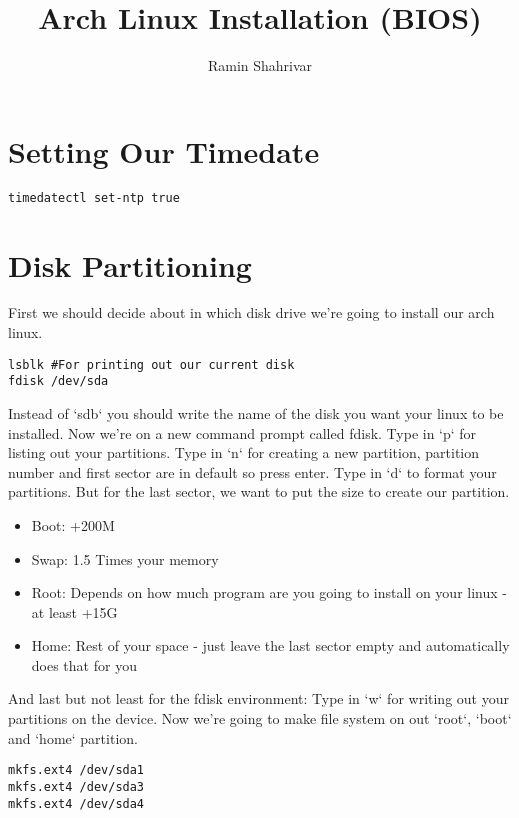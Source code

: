\documentclass[12pt]{article}
\title{Arch Linux Installation (BIOS)}
\author{Ramin Shahrivar}
\begin{document}
\maketitle
\tableofcontents
\pagebreak
\thispagestyle{empty}


\section{Setting Our Timedate}
\begin{verbatim}
timedatectl set-ntp true
\end{verbatim}

\section{Disk Partitioning}
First we should decide about in which disk drive we're going to install our arch linux.
\begin{verbatim}
lsblk #For printing out our current disk
fdisk /dev/sda
\end{verbatim}
Instead of `sdb` you should write the name of the disk you want your linux to be installed.
Now we're on a new command prompt called fdisk.
Type in `p` for listing out your partitions.
Type in `n` for creating a new partition, partition number and first sector are in default so press enter.
Type in `d` to format your partitions.
But for the last sector, we want to put the size to create our partition.

\begin{framed}
\begin{itemize}
\item{Boot: +200M}
\item{Swap: 1.5 Times your memory}
\item{Root: Depends on how much program are you going to install on your linux - at least +15G}
\item{Home: Rest of your space - just leave the last sector empty and automatically does that for you}
\end{itemize}
\end{framed}

And last but not least for the fdisk environment:
Type in `w` for writing out your partitions on the device.
Now we're going to make file system on out `root`, `boot` and `home` partition.

\begin{verbatim}
mkfs.ext4 /dev/sda1
mkfs.ext4 /dev/sda3
mkfs.ext4 /dev/sda4
\end{verbatim}
\end{document}
